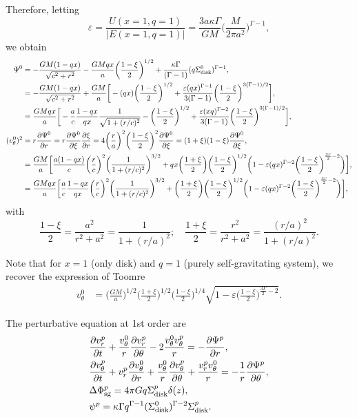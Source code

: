 \documentclass[11pt]{article}
\newcommand{\vr}{v_{r}}
\newcommand{\vt}{v_{\theta}}
\newcommand{\Sigmad}{\Sigma_{\rm{disk}}}
\newcommand{\Phisg}{\Phi_{\rm{sg}}}
\begin{document}
Therefore, letting  $$\varepsilon = \frac{U(x=1,q=1)}{|E(x=1,q=1)|} =\frac{3a \kappa \Gamma}{GM} \bigg(\frac{M}{2\pi a^2}\bigg)^{\Gamma-1},$$  we obtain
\begin{align*}
\Psi^0 &=  - \frac{G M (1-qx)}{\sqrt{c^2+r^2}}-\frac{G M qx}{a }\bigg(\frac{1-\xi}{2}\bigg)^{1/2} + \frac{\kappa \Gamma}{(\Gamma-1)} (q\Sigmad^0)^{\Gamma-1} ,\\
{}&=  -\frac{G M (1-qx)}{\sqrt{c^2+r^2}}+\frac{G M }{a} \bigg[-(qx)\bigg(\frac{1-\xi}{2}\bigg)^{1/2} + \frac{\varepsilon(qx)^{\Gamma-1}}{3(\Gamma-1)}\bigg(\frac{1-\xi}{2}\bigg)^{3(\Gamma-1)/2} \bigg] ,\\
&=  \frac{G Mqx}{a}\bigg[-\frac{a}{c}\frac{ 1-qx}{qx}\frac{1}{ \sqrt{1+(r/c)^2}} -\bigg(\frac{1-\xi}{2}\bigg)^{1/2} + \frac{\varepsilon(xq)^{\Gamma-2}}{3(\Gamma-1)}\bigg(\frac{1-\xi}{2}\bigg)^{3(\Gamma-1)/2} \bigg],\\
(\vt^0)^2 &= r \frac{\partial \Psi^0}{\partial r} =r \frac{\partial \Psi^0}{\partial \xi} \frac{\partial \xi}
{\partial r} = 4\bigg(\frac{r}{a}\bigg)^2    \bigg(\frac{1-\xi}{2}\bigg)^2 \frac{\partial \Psi^0}{\partial \xi}= (1+\xi) (1-\xi) \frac{\partial \Psi^0}{\partial \xi}  ,\\
&=\frac{GM}{a}\bigg[\frac{a(1-qx)}{c}\bigg( \frac{r}{c}\bigg)^2 \bigg(\frac{1}{1+(r/c)^2}\bigg)^{3/2} 
+ qx\bigg(\frac{1+\xi}{2}\bigg) \bigg(\frac{1-\xi}{2}\bigg)^{1/2}  \bigg(1- \varepsilon(qx)^{\Gamma-2}\bigg(\frac{1-\xi}{2}\bigg)^{\frac{3\Gamma}{2}-2} \bigg) \bigg], \\
&=\frac{GMqx}{a}\bigg[\frac{a}{c}\frac{1-qx}{qx}\bigg( \frac{r}{c}\bigg)^2 \bigg(\frac{1}{1+(r/c)^2}\bigg)^{3/2} 
+ \bigg(\frac{1+\xi}{2}\bigg) \bigg(\frac{1-\xi}{2}\bigg)^{1/2}  \bigg(1- \varepsilon(qx)^{\Gamma-2}\bigg(\frac{1-\xi}{2}\bigg)^{\frac{3\Gamma}{2}-2} \bigg) \bigg],
\end{align*}
with
$$\frac{1-\xi}{2}= \frac{a^2}{r^2+a^2}= \frac{1}{1+(r/a)^2}; \quad \frac{1+\xi}{2}= \frac{r^2}{r^2+a^2}= \frac{(r/a)^2}{1+(r/a)^2}.$$

Note that for $x=1$ (only disk) and $q=1$ (purely self-gravitating system), we recover the expression of Toomre
\begin{align*}
\vt^0 &=\bigg(\frac{GM}{a} \bigg)^{1/2}\bigg(\frac{1+\xi}{2}\bigg)^{1/2} \bigg(\frac{1-\xi}{2}\bigg)^{1/4}  \sqrt{1- \varepsilon \bigg(\frac{1-\xi}{2}\bigg)^{\frac{3\Gamma}{2}-2}} .
\end{align*}

The perturbative equation at 1st order are
\begin{align*}
&\frac{\partial \vr^p}{\partial t} + \frac{\vt^0}{r} \frac{\partial \vr^p}{\partial \theta} - 2\frac{\vt^0 \vt^p}{r} = -\frac{\partial \Psi^p}{\partial r} ,\\
&\frac{\partial \vt^p}{\partial t} + \vr^p \frac{\partial \vt^0}{\partial r} + \frac{\vt^0}{r} \frac{\partial \vt^p}{\partial \theta} + \frac{\vr^p\vt^0}{r} = -\frac{1}{r}\frac{\partial \Psi^p}{\partial \theta} ,\\
& \Delta \Phisg^p = 4\pi G q \Sigmad^p \delta (z), \\
& \psi^p =  \kappa \Gamma q^{\Gamma-1} (\Sigmad^0)^{\Gamma-2} \Sigmad^p .
\end{align*}
\end{document}
